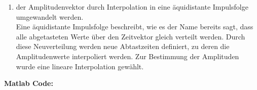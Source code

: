 \begin{enumerate}[label=\alph*)]
	\item der Amplitudenvektor durch Interpolation in eine äquidistante Impulsfolge umgewandelt werden. \vspace{4pt}\\
	Eine äquidistante Impulsfolge beschreibt, wie es der Name bereits sagt, dass alle abgetasteten Werte über den Zeitvektor gleich verteilt werden. Durch diese Neuverteilung werden neue Abtastzeiten definiert, zu deren die Amplitudenwerte interpoliert werden. Zur Bestimmung der Amplituden wurde eine lineare Interpolation gewählt. \\	
\end{enumerate}
	
\textbf{Matlab Code:}
